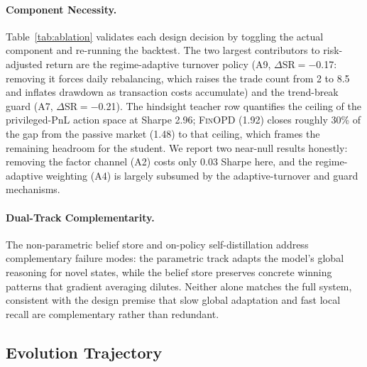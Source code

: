 \paragraph{Component Necessity.} Table~\ref{tab:ablation} validates each design decision by toggling the actual component and re-running the backtest. The two largest contributors to risk-adjusted return are the regime-adaptive turnover policy (A9, $\Delta$SR$=-$0.17: removing it forces daily rebalancing, which raises the trade count from 2 to 8.5 and inflates drawdown as transaction costs accumulate) and the trend-break guard (A7, $\Delta$SR$=-$0.21). The hindsight teacher row quantifies the ceiling of the privileged-PnL action space at Sharpe 2.96; \textsc{FinOPD} (1.92) closes roughly 30\% of the gap from the passive market (1.48) to that ceiling, which frames the remaining headroom for the student. We report two near-null results honestly: removing the factor channel (A2) costs only 0.03 Sharpe here, and the regime-adaptive weighting (A4) is largely subsumed by the adaptive-turnover and guard mechanisms.

\paragraph{Dual-Track Complementarity.} The non-parametric belief store and on-policy self-distillation address complementary failure modes: the parametric track adapts the model's global reasoning for novel states, while the belief store preserves concrete winning patterns that gradient averaging dilutes. Neither alone matches the full system, consistent with the design premise that slow global adaptation and fast local recall are complementary rather than redundant.

\subsection{Evolution Trajectory}

